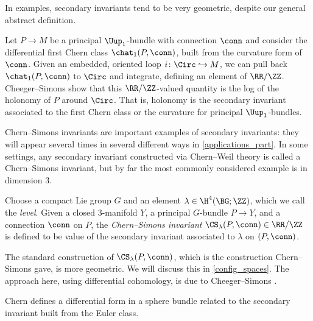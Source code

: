 In examples, secondary invariants tend to be very geometric, despite our general abstract definition.
\begin{example}
Let $P\to M$ be a principal $\Uup_{1}$-bundle with connection $\conn$ and consider the differential
first Chern class $\chat_1(P, \conn)$, built from the curvature form of $\conn$. Given an embedded, oriented loop
$i\colon \Circ\hookrightarrow M$, we can pull back $\chat_1(P, \conn)$ to $\Circ$ and integrate, defining an element
of $\RR/\ZZ$. Cheeger--Simons \cite[Example 1.5]{MR827262} show that this $\RR/\ZZ$-valued quantity is the log of
the holonomy of $P$ around $\Circ$. That is, holonomy is the secondary invariant associated to the first Chern class
or the curvature for principal $\Uup_1$-bundles.
\end{example}
\begin{example}
\label{secondary_chern_simons}
Chern--Simons invariants are important examples of secondary invariants: they will appear several times in several
different ways in \cref{applications_part}. In some settings, any secondary invariant constructed via Chern--Weil
theory is called a Chern--Simons invariant, but by far the most commonly considered example is in dimension $3$.

Choose a compact Lie group $G$ and an element $\lambda\in\H^4(\BG;\ZZ)$, which we call the
\emph{level}. Given a closed $3$-manifold $Y$, a principal $G$-bundle $P\to Y$, and a connection $\conn$ on $P$,
the \emph{Chern--Simons invariant} $\CS_\lambda(P,\conn)\in\RR/\ZZ$ \cite{cs} is defined to be value of
the secondary invariant associated to $\lambda$ on $(P,
\conn)$.

The standard construction of $\CS_\lambda(P, \conn)$, which is the construction Chern--Simons gave, is more
geometric. We will discuss this in \cref{config_spaces}. The approach here, using differential cohomology, is due
to Cheeger--Simons \cite{MR827262}.
\end{example}
Chern \cite{Che44} defines a differential form in a sphere bundle related to the secondary invariant built from the
Euler class.

